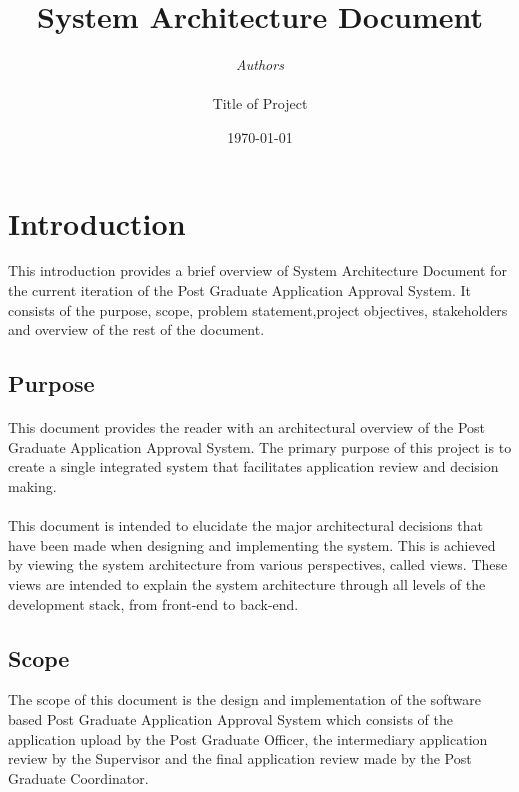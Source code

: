 \documentclass[11pt]{article}
\begin{document}

\thispagestyle{empty}
\title{{\LARGE\bf System Architecture Document}}
\author{{\Large\it Authors} \\
\vspace*{2.5in} 
\mbox{} \\
{\Large Title of Project}
\vspace*{2.5in} 
\mbox{} \\
\date{\today}
}
\maketitle

\tableofcontents

%
\newpage
\section{Introduction}
This introduction provides a brief overview of System Architecture Document for the current iteration of the Post Graduate Application Approval System. It consists of the purpose, scope, problem statement,project objectives, stakeholders and overview of the rest of the document.
\subsection{Purpose}
\paragraph{}This document provides the reader with an architectural overview of the Post Graduate Application Approval System. The primary purpose of this project is to create a single integrated system that facilitates application review and decision making.

\paragraph{}This document is intended to elucidate the major architectural decisions that have been made when designing and implementing the system. This is achieved by viewing the system architecture from various perspectives, called views. These views are intended to explain the system architecture through all levels of the development stack, from front-end to back-end.


\subsection{Scope}
The scope of this document is the design and implementation of the software based Post Graduate Application Approval System which consists of the application upload by the Post Graduate Officer, the intermediary application review by the Supervisor and the final application review made by the Post Graduate Coordinator.
\end{document}
